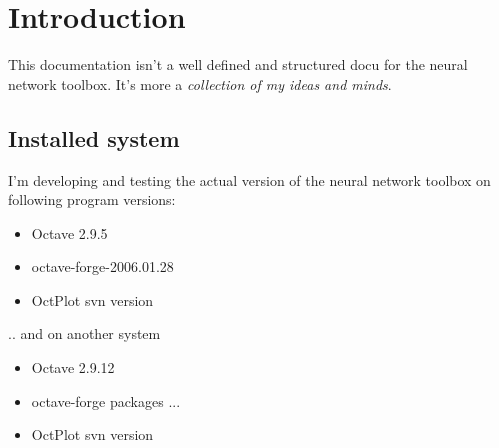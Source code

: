\chapter{Introduction}
This documentation isn't a well defined and structured docu for the neural network toolbox.
It's more a \textit{collection of my ideas and minds}.

\section{Installed system}
I'm developing and testing the actual version of the neural network toolbox on following 
program versions:

\begin{itemize}
  \item Octave 2.9.5
  \item octave-forge-2006.01.28
  \item OctPlot svn version
\end{itemize}

.. and on another system

\begin{itemize}
  \item Octave 2.9.12
  \item octave-forge packages ...
  \item OctPlot svn version
\end{itemize}






